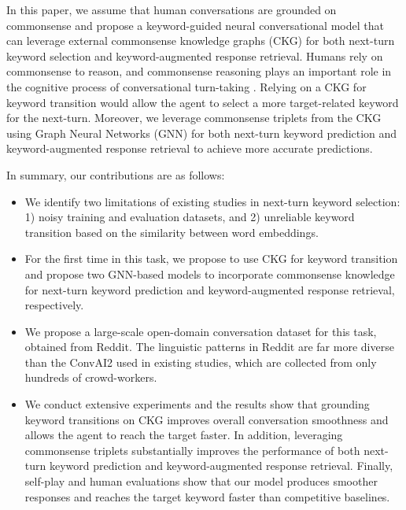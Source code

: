 \documentclass[letterpaper]{article} %
\begin{document}
In this paper, we assume that human conversations are grounded on commonsense and propose a keyword-guided neural conversational model that can leverage external commonsense knowledge graphs (CKG) for both next-turn keyword selection and keyword-augmented response retrieval. Humans rely on commonsense to reason, and commonsense reasoning plays an important role in the cognitive process of conversational turn-taking \cite{schegloff1991conversation, stocky2004commonsense, lieberman2004beating}. Relying on a CKG for keyword transition would allow the agent to select a more target-related keyword for the next-turn.
Moreover, we leverage commonsense triplets from the CKG using Graph Neural Networks (GNN) for both next-turn keyword prediction and keyword-augmented response retrieval to achieve more accurate predictions.

In summary, our contributions are as follows:
\begin{itemize}
    \item We identify two limitations of existing studies in next-turn keyword selection: 1) noisy training and evaluation datasets, and 2) unreliable keyword transition based on the similarity between word embeddings.
    \item For the first time in this task, we propose to use CKG for keyword transition and propose two GNN-based models to incorporate commonsense knowledge for next-turn keyword prediction and keyword-augmented response retrieval, respectively.
    \item We propose a large-scale open-domain conversation dataset for this task, obtained from Reddit. The linguistic patterns in Reddit are far more diverse than the ConvAI2 \cite{zhang2018personalizing} used in existing studies, which are collected from only hundreds of crowd-workers.
    \item We conduct extensive experiments and the results show that grounding keyword transitions on CKG improves overall conversation smoothness and allows the agent to reach the target faster. In addition, leveraging commonsense triplets substantially improves the performance of both next-turn keyword prediction and keyword-augmented response retrieval. Finally, self-play and human evaluations show that our model produces smoother responses and reaches the target keyword faster than competitive baselines.
\end{itemize}
\end{document}
